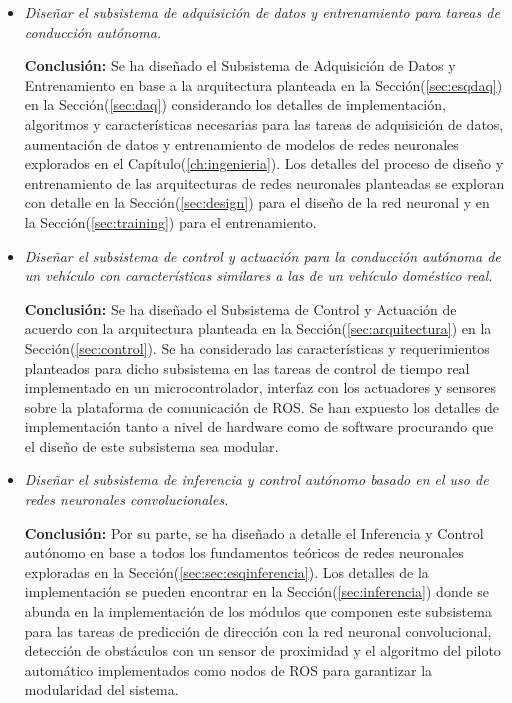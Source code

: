 \begin{itemize}
    \item \textit{Diseñar el subsistema de adquisición de datos y entrenamiento para tareas de conducción autónoma.}
    
    \textbf{Conclusión:} Se ha diseñado el Subsistema de Adquisición de Datos y Entrenamiento en base a la arquitectura planteada 
    en la Sección(\ref{sec:esqdaq}) en la Sección(\ref{sec:daq}) considerando los detalles de implementación, algoritmos y características necesarias para 
    las tareas de adquisición de datos, aumentación de datos y entrenamiento de modelos de redes neuronales explorados en el Capítulo(\ref{ch:ingenieria}).
    Los detalles del proceso de diseño y entrenamiento de las arquitecturas de redes neuronales planteadas se exploran con detalle en la 
    Sección(\ref{sec:design}) para el diseño de la red neuronal y en la Sección(\ref{sec:training}) para el entrenamiento. 

    \item \textit{Diseñar el subsistema de control y actuación para la conducción autónoma de un vehículo con características 
    similares a las de un vehículo doméstico real.}

    \textbf{Conclusión:} Se ha diseñado el Subsistema de Control y Actuación de acuerdo con la arquitectura planteada en la 
    Sección(\ref{sec:arquitectura}) en la Sección(\ref{sec:control}). Se ha considerado las características y requerimientos 
    planteados para dicho subsistema en 
    las tareas de control de tiempo real implementado en un microcontrolador, interfaz con los actuadores y sensores 
    sobre la plataforma de comunicación de ROS. Se han expuesto los detalles de implementación tanto a nivel de hardware 
    como de software procurando que el diseño de este subsistema sea modular.

    \item \textit{Diseñar el subsistema de inferencia y control autónomo basado en el uso de redes neuronales convolucionales.}
    
    \textbf{Conclusión:} Por su parte, se ha diseñado a detalle el Inferencia y Control autónomo en base a todos los fundamentos 
    teóricos de redes neuronales exploradas en la Sección(\ref{sec:sec:esqinferencia}). Los detalles de la implementación se pueden 
    encontrar en la Sección(\ref{sec:inferencia})
    donde se abunda en la implementación de los módulos que componen este subsistema para las tareas de predicción de dirección
    con la red neuronal convolucional, detección de obstáculos con un sensor de proximidad y el algoritmo del piloto automático 
    implementados como nodos de ROS para garantizar la modularidad del sistema.


\end{itemize}
